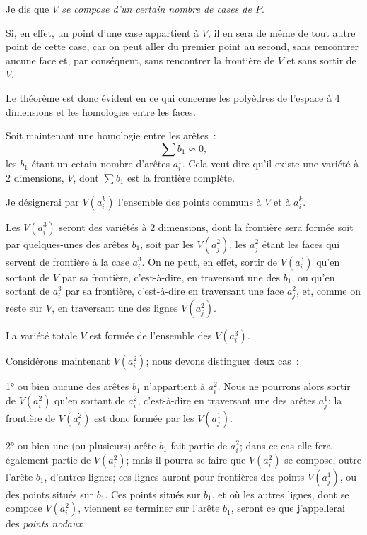 \documentclass{article}
\begin{document}
Je dis que \emph{$V$ se compose d'un certain nombre de cases de $P$}.

Si, en effet, un point d'une case appartient à $V$, il en sera de même de tout autre point de cette case, car on peut aller du premier point au second, sans rencontrer aucune face et, par conséquent, sans rencontrer la frontière de $V$ et sans sortir de $V$.

Le théorème est donc évident en ce qui concerne les polyèdres de l'espace à 4 dimensions et les homologies entre les faces.

Soit maintenant une homologie entre les arêtes~:
\[ \sum b_{1} \backsim 0, \]
les $b_{1}$ étant un cetain nombre d'arêtes $a^{1}_{i}$. Cela veut dire qu'il existe une variété à 2 dimensions, $V$, dont $\displaystyle\sum b_{1}$ est la frontière complète.

Je désignerai par $V(a^{k}_{i})$ l'ensemble des points communs à $V$ et à $a^{k}_{i}$.

Les $V(a^{3}_{i})$ seront des variétés à 2 dimensions, dont la frontière sera formée soit par quelques-unes des arêtes $b_{1}$, soit par les $V(a^{2}_{j})$, les $a^{2}_{j}$ étant les faces qui servent de frontière à la case $a^{3}_{i}$. On ne peut, en effet, sortir de $V(a^{3}_{i})$ qu'en sortant de $V$ par sa frontière, c'est-à-dire, en traversant une des $b_{1}$, ou qu'en sortant de $a^{3}_{i}$ par sa frontière, c'est-à-dire en traversant une face $a^{2}_{j}$, et, comme on reste sur $V$, en traversant une des lignes $V(a^{2}_{j})$.

La variété totale $V$ est formée de l'ensemble des $V(a^{3}_{i})$.

Considérons maintenant $V(a^{2}_{i})$; nous devons distinguer deux cas~:

1° ou bien aucune des arêtes $b_{1}$ n'appartient à $a^{2}_{i}$. Nous ne pourrons alors sortir de $V(a^{2}_{i})$ qu'en sortant de $a^{2}_{i}$, c'est-à-dire en traversant une des arêtes $a^{1}_{j}$; la frontière de $V(a^{2}_{i})$ est donc formée par les $V(a^{1}_{j})$.


2° ou bien une (ou plusieurs) arête $b_{1}$ fait partie de $a^{2}_{i}$; dans ce cas elle fera également partie de $V(a^{2}_{i})$; mais il pourra se faire que $V(a^{2}_{i})$ se compose, outre l'arête $b_{1}$, d'autres lignes; ces lignes auront pour frontières des points $V(a^{1}_{j})$, ou des points situés sur $b_{1}$. Ces points situés sur $b_{1}$, et où les autres lignes, dont se compose $V(a^{2}_{i})$, viennent se terminer sur l'arête $b_{1}$, seront ce que j'appellerai des \emph{points nodaux}.
\end{document}
